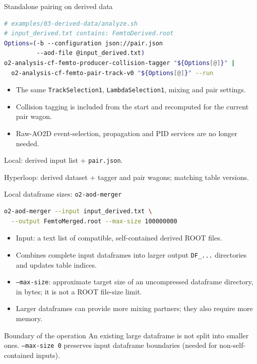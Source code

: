 \begin{frame}[fragile]{Standalone pairing on derived data}
 \small
 \begin{lstlisting}[language=bash]
# examples/03-derived-data/analyze.sh
# input_derived.txt contains: FemtoDerived.root
Options=(-b --configuration json://pair.json
         --aod-file @input_derived.txt)
o2-analysis-cf-femto-producer-collision-tagger "${Options[@]}" |
  o2-analysis-cf-femto-pair-track-v0 "${Options[@]}" --run
 \end{lstlisting}
 \begin{itemize}
 \item The same \texttt{TrackSelection1}, \texttt{LambdaSelection1}, mixing and pair settings.
 \item Collision tagging is included from the start and recomputed for the current pair wagon.
 \item Raw-AO2D event-selection, propagation and PID services are no longer needed.
 \end{itemize}
 \small Local: derived input list + \texttt{pair.json}.\par
 Hyperloop: derived dataset + tagger and pair wagons; matching table versions.
\end{frame}

\begin{frame}[fragile]{Local dataframe sizes: \texttt{o2-aod-merger}}
 \begin{lstlisting}[language=bash]
o2-aod-merger --input input_derived.txt \
  --output FemtoMerged.root --max-size 100000000
 \end{lstlisting}
 \begin{itemize}
 \item Input: a text list of compatible, self-contained derived ROOT files.
 \item Combines complete input dataframes into larger output \texttt{DF\_...} directories and updates table indices.
 \item \texttt{--max-size}: approximate target size of an uncompressed dataframe directory, in bytes; it is not a ROOT file-size limit.
 \item Larger dataframes can provide more mixing partners; they also require more memory.
 \end{itemize}
 \begin{block}{Boundary of the operation}
 An existing large dataframe is not split into smaller ones. \texttt{--max-size 0} preserves input dataframe boundaries (needed for non-self-contained inputs).
 \end{block}
 \src{O2/Framework/AODMerger/src/aodMerger.cxx}
\end{frame}
